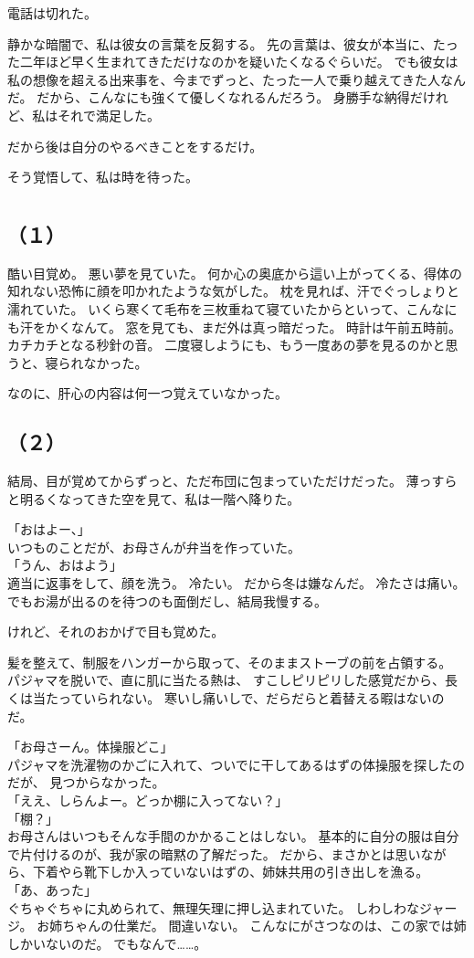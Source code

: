 \documentclass[../IHMain]{subfiles}
\begin{document}
電話は切れた。

静かな暗闇で、私は彼女の言葉を反芻する。
先の言葉は、彼女が本当に、たった二年ほど早く生まれてきただけなのかを疑いたくなるぐらいだ。
でも彼女は私の想像を超える出来事を、今までずっと、たった一人で乗り越えてきた人なんだ。
だから、こんなにも強くて優しくなれるんだろう。
身勝手な納得だけれど、私はそれで満足した。

だから後は自分のやるべきことをするだけ。

そう覚悟して、私は時を待った。

\section{}
\subsection*{\gt \centering（１）}
酷い目覚め。
悪い夢を見ていた。
何か心の奥底から這い上がってくる、得体の知れない恐怖に顔を叩かれたような気がした。
枕を見れば、汗でぐっしょりと濡れていた。
いくら寒くて毛布を三枚重ねて寝ていたからといって、こんなにも汗をかくなんて。
窓を見ても、まだ外は真っ暗だった。
時計は午前五時前。
カチカチとなる秒針の音。
二度寝しようにも、もう一度あの夢を見るのかと思うと、寝られなかった。

なのに、肝心の内容は何一つ覚えていなかった。

\subsection*{\gt（２）}
結局、目が覚めてからずっと、ただ布団に包まっていただけだった。
薄っすらと明るくなってきた空を見て、私は一階へ降りた。

「おはよー、」\\
いつものことだが、お母さんが弁当を作っていた。\\
「うん、おはよう」\\
適当に返事をして、顔を洗う。
冷たい。
だから冬は嫌なんだ。
冷たさは痛い。
でもお湯が出るのを待つのも面倒だし、結局我慢する。

けれど、それのおかげで目も覚めた。

髪を整えて、制服をハンガーから取って、そのままストーブの前を占領する。
パジャマを脱いで、直に肌に当たる熱は、
すこしピリピリした感覚だから、長くは当たっていられない。
寒いし痛いしで、だらだらと着替える暇はないのだ。

「お母さーん。体操服どこ」\\
パジャマを洗濯物のかごに入れて、ついでに干してあるはずの体操服を探したのだが、
見つからなかった。\\
「ええ、しらんよー。どっか棚に入ってない？」\\
「棚？」\\
お母さんはいつもそんな手間のかかることはしない。
基本的に自分の服は自分で片付けるのが、我が家の暗黙の了解だった。
だから、まさかとは思いながら、下着やら靴下しか入っていないはずの、姉妹共用の引き出しを漁る。\\
「あ、あった」\\
ぐちゃぐちゃに丸められて、無理矢理に押し込まれていた。
しわしわなジャージ。
お姉ちゃんの仕業だ。
間違いない。
こんなにがさつなのは、この家では姉しかいないのだ。
でもなんで……。
\end{document}
